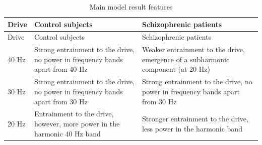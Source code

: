 \documentclass[10pt,a4paper,onecolumn]{article}
\begin{document}
\begin{longtable}[]{@{}lll@{}}
\caption{Main model result features}\label{tbl:mainresults}\tabularnewline
\toprule
\begin{minipage}[b]{0.08\columnwidth}\raggedright\strut
Drive\strut
\end{minipage} & \begin{minipage}[b]{0.41\columnwidth}\raggedright\strut
Control subjects\strut
\end{minipage} & \begin{minipage}[b]{0.42\columnwidth}\raggedright\strut
Schizophrenic patients\strut
\end{minipage}\tabularnewline
\midrule
\endfirsthead
\toprule
\begin{minipage}[b]{0.08\columnwidth}\raggedright\strut
Drive\strut
\end{minipage} & \begin{minipage}[b]{0.41\columnwidth}\raggedright\strut
Control subjects\strut
\end{minipage} & \begin{minipage}[b]{0.42\columnwidth}\raggedright\strut
Schizophrenic patients\strut
\end{minipage}\tabularnewline
\midrule
\endhead
\begin{minipage}[t]{0.08\columnwidth}\raggedright\strut
40 Hz\strut
\end{minipage} & \begin{minipage}[t]{0.41\columnwidth}\raggedright\strut
Strong entrainment to the drive, no power in frequency bands apart from
40 Hz\strut
\end{minipage} & \begin{minipage}[t]{0.42\columnwidth}\raggedright\strut
Weaker entrainment to the drive, emergence of a subharmonic component
(at 20 Hz)\strut
\end{minipage}\tabularnewline
\begin{minipage}[t]{0.08\columnwidth}\raggedright\strut
30 Hz\strut
\end{minipage} & \begin{minipage}[t]{0.41\columnwidth}\raggedright\strut
Strong entrainment to the drive, no power in frequency bands apart from
30 Hz\strut
\end{minipage} & \begin{minipage}[t]{0.42\columnwidth}\raggedright\strut
Strong entrainment to the drive, no power in frequency bands apart from
30 Hz\strut
\end{minipage}\tabularnewline
\begin{minipage}[t]{0.08\columnwidth}\raggedright\strut
20 Hz\strut
\end{minipage} & \begin{minipage}[t]{0.41\columnwidth}\raggedright\strut
Entrainment to the drive, however, more power in the harmonic 40 Hz
band\strut
\end{minipage} & \begin{minipage}[t]{0.42\columnwidth}\raggedright\strut
Stronger entrainment to the drive, less power in the harmonic band\strut
\end{minipage}\tabularnewline
\bottomrule
\end{longtable}
\end{document}
